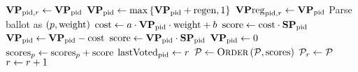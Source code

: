 \begin{algorithm}[H]
  \caption{$\textsc{HandleVote}\left(\mathrm{ballot},
  \player_{\pid}\right)$}
  \label{alg:steem:handlevote}
  \begin{algorithmic}[1]
     
      \State $\mathrm{\textbf{VP}}_{\mathrm{pid}, r} \gets \mathrm{\textbf{VP}}_{\mathrm{pid}}$ 
      \State $\mathrm{\textbf{VP}}_{\mathrm{pid}} \gets \max{\lbrace \mathrm{\textbf{VP}}_{\mathrm{pid}} + \mathrm{regen}, 1
      \rbrace}$
      \State $\mathrm{\textbf{VP}reg}_{\mathrm{pid}, r} \gets \mathrm{\textbf{VP}}_{\mathrm{pid}}$ 
      \label{alg:steem:handlevote:regen}
        \State Parse ballot as $\left(p, \mathrm{weight}\right)$
        \State $\mathrm{cost} \gets a \cdot \mathrm{\textbf{VP}}_{\mathrm{pid}} \cdot
        \mathrm{weight} + b$
        \label{alg:steem:handlevote:cost:start}
          \State $\mathrm{score} \gets \mathrm{cost} \cdot \mathrm{\textbf{SP}}_{\mathrm{pid}}$
          \State $\mathrm{\textbf{VP}}_{\mathrm{pid}} \gets \mathrm{\textbf{VP}}_{\mathrm{pid}} - \mathrm{cost}$
        \Else
          \State $\mathrm{score} \gets \mathrm{\textbf{VP}}_{\mathrm{pid}} \cdot
          \mathrm{\textbf{SP}}_{\mathrm{pid}}$
          \State $\mathrm{\textbf{VP}}_{\mathrm{pid}} \gets 0$
        \EndIf
        \label{alg:steem:handlevote:cost:end}
        \State $\mathrm{scores}_p \gets \mathrm{scores}_p +
        \mathrm{score}$
      \EndIf
      \State $\mathrm{lastVoted}_{\mathrm{pid}} \gets r$
    \EndIf
      \State $\mathcal{P} \gets \textsc{Order}\left(\mathcal{P},
      \mathrm{scores}\right)$ 
      \label{alg:steem:handlevote:order}
      \State $\mathcal{P}_r \gets \mathcal{P}$ 
      \State $r \gets r + 1$
    \EndIf {}
  \end{algorithmic}
\end{algorithm}

